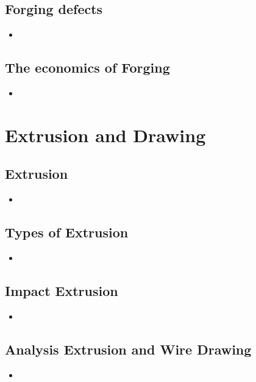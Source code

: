 \documentclass[8pt]{report}
\begin{document}
\section{Forging defects}
	\begin{itemize}
		\item
	\end{itemize}\hrulefill
\section{The economics of Forging}
	\begin{itemize}
		\item
	\end{itemize}\hrulefill
\chapter{Extrusion and Drawing}
\section{Extrusion}
	\begin{itemize}
		\item
	\end{itemize}\hrulefill
\section{Types of Extrusion}
	\begin{itemize}
		\item
	\end{itemize}\hrulefill
\section{Impact Extrusion}
	\begin{itemize}
		\item
	\end{itemize}\hrulefill
\section{Analysis Extrusion and Wire Drawing}
	\begin{itemize}
		\item
	\end{itemize}\hrulefill
\end{document}
